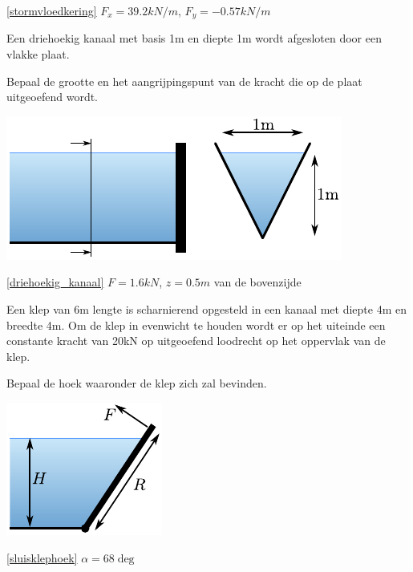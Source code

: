 	\begin{antwoord}{\ref{stormvloedkering}}
		$F_x = 39.2\unit{kN/m}$, $F_y = -0.57\unit{kN/m}$
	\end{antwoord}
	\begin{toepassing}
		\label{driehoekig_kanaal}
Een driehoekig kanaal met basis 1m en diepte 1m wordt afgesloten door een vlakke plaat.
		
Bepaal de grootte en het aangrijpingspunt van de kracht die op de plaat uitgeoefend wordt.

\centering
\includegraphics{fig/hydrostatica/driehoekig_kanaal}
	\end{toepassing}
	\begin{antwoord}{\ref{driehoekig_kanaal}}
		$F = 1.6\unit{kN}$, $z=0.5\unit{m}$ van de bovenzijde
	\end{antwoord}
	\begin{toepassing}
		\label{sluisklephoek}
Een klep van 6m lengte is scharnierend opgesteld in een kanaal met diepte 4m en breedte 4m. Om de klep in evenwicht te houden wordt er op het uiteinde een constante kracht van 20kN op uitgeoefend loodrecht op het oppervlak van de klep.
		
Bepaal de hoek waaronder de klep zich zal bevinden.

\centering
\includegraphics{fig/hydrostatica/sluisklephoek}
	\end{toepassing}
	\begin{antwoord}{\ref{sluisklephoek}}
		$\alpha = 68\deg$ 
	\end{antwoord}	
